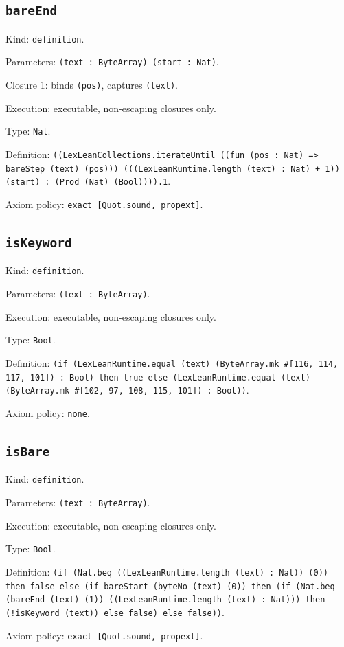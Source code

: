 \documentclass[11pt]{article}
\begin{document}
\subsection*{\texttt{bareEnd}}
\noindent Kind: \texttt{definition}.\par
\noindent Parameters: \texttt{(text : ByteArray) (start : Nat)}.\par
\noindent Closure 1: binds \texttt{(pos)}, captures \texttt{(text)}.\par
\noindent Execution: executable, non-escaping closures only.\par
\noindent Type: \texttt{Nat}.\par
\noindent Definition: \texttt{((LexLeanCollections.iterateUntil ((fun (pos : Nat) => bareStep (text) (pos))) (((LexLeanRuntime.length (text) : Nat) + 1)) (start) : (Prod (Nat) (Bool)))).1}.\par
\noindent Axiom policy: \texttt{exact [Quot.sound, propext]}.\par
\subsection*{\texttt{isKeyword}}
\noindent Kind: \texttt{definition}.\par
\noindent Parameters: \texttt{(text : ByteArray)}.\par
\noindent Execution: executable, non-escaping closures only.\par
\noindent Type: \texttt{Bool}.\par
\noindent Definition: \texttt{(if (LexLeanRuntime.equal (text) (ByteArray.mk \#[116, 114, 117, 101]) : Bool) then true else (LexLeanRuntime.equal (text) (ByteArray.mk \#[102, 97, 108, 115, 101]) : Bool))}.\par
\noindent Axiom policy: \texttt{none}.\par
\subsection*{\texttt{isBare}}
\noindent Kind: \texttt{definition}.\par
\noindent Parameters: \texttt{(text : ByteArray)}.\par
\noindent Execution: executable, non-escaping closures only.\par
\noindent Type: \texttt{Bool}.\par
\noindent Definition: \texttt{(if (Nat.beq ((LexLeanRuntime.length (text) : Nat)) (0)) then false else (if bareStart (byteNo (text) (0)) then (if (Nat.beq (bareEnd (text) (1)) ((LexLeanRuntime.length (text) : Nat))) then (!isKeyword (text)) else false) else false))}.\par
\noindent Axiom policy: \texttt{exact [Quot.sound, propext]}.\par
\end{document}
